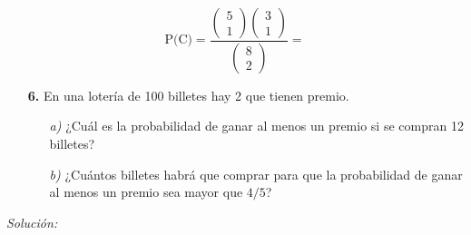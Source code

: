 \documentclass[11pt,a4paper]{article}
\theoremstyle{definition}
\begin{document}
$$\text{P(C)} = \frac{\left(\begin{matrix}5 \\ 1\end{matrix}\right) \left(\begin{matrix}3 \\ 1\end{matrix}\right)}{\left(\begin{matrix}8 \\ 2\end{matrix}\right)}=$$



\pagebreak

\begin{itemize}
	\item[\textbf{6.}] En una lotería de 100 billetes hay 2 que tienen premio. 
	\begin{itemize}
		\item[\emph{a)}] ¿Cuál es la probabilidad de ganar al menos un premio si se compran 12 billetes?
		\item[\emph{b)}] ¿Cuántos billetes habrá que comprar para que la probabilidad de ganar al menos un premio sea mayor que $4/5$?
	\end{itemize}
\end{itemize}

{\color{grey}\hrulefill}

\emph{Solución:}
\end{document}
